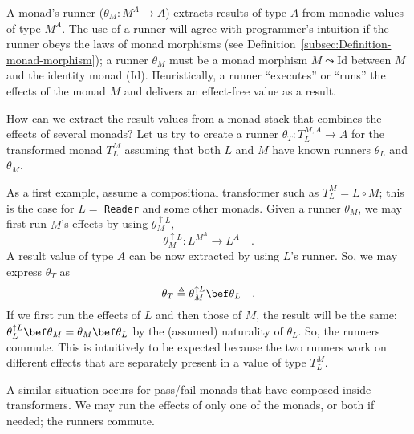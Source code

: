 A monad\textsf{'}s runner ($\theta_{M}:M^{A}\rightarrow A$) extracts results
of type $A$ from monadic values of type $M^{A}$. The use of a runner
will agree with programmer\textsf{'}s intuition if the runner obeys the laws
of monad morphisms (see Definition~\ref{subsec:Definition-monad-morphism});
a runner $\theta_{M}$ must be a monad morphism $M\leadsto\text{Id}$
between $M$ and the identity monad ($\text{Id}$). Heuristically,
a runner \textsf{``}executes\textsf{''} or \textsf{``}runs\textsf{''} the effects of the monad $M$
and delivers an effect-free value as a result.

How can we extract the result values from a monad stack that combines
the effects of several monads? Let us try to create a runner $\theta_{T}:T_{L}^{M,A}\rightarrow A$
for the transformed monad $T_{L}^{M}$ assuming that both $L$ and
$M$ have known runners $\theta_{L}$ and $\theta_{M}$.

As a first example, assume a compositional transformer such as $T_{L}^{M}=L\circ M$;
this is the case for $L=$ \lstinline!Reader! and some other monads.
Given a runner $\theta_{M}$, we may first run $M$\textsf{'}s effects by using
$\theta_{M}^{\uparrow L}$,
\[
\theta_{M}^{\uparrow L}:L^{M^{A}}\rightarrow L^{A}\quad.
\]
A result value of type $A$ can be now extracted by using $L$\textsf{'}s runner.
So, we may express $\theta_{T}$ as
\[
\theta_{T}\triangleq\theta_{M}^{\uparrow L}\bef\theta_{L}\quad.
\]
If we first run the effects of $L$ and then those of $M$, the result
will be the same: $\theta_{L}^{\uparrow L}\bef\theta_{M}=\theta_{M}\bef\theta_{L}$
by the (assumed) naturality of $\theta_{L}$. So, the runners commute.
This is intuitively to be expected because the two runners work on
different effects that are separately present in a value of type $T_{L}^{M}$.

A similar situation occurs for pass/fail monads that have composed-inside
transformers. We may run the effects of only one of the monads, or
both if needed; the runners commute.

